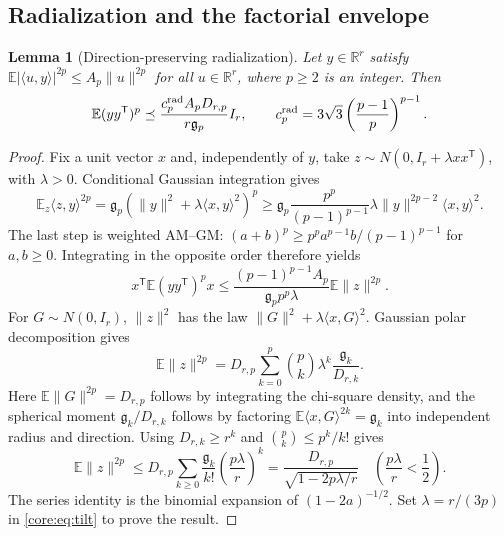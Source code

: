 \documentclass[11pt,a4paper]{article}
\newtheorem{lemma}[theorem]{Lemma}
\theoremstyle{definition}\newtheorem{definition}[theorem]{Definition}
\theoremstyle{remark}\newtheorem{remark}[theorem]{Remark}
\numberwithin{equation}{section}
\newcommand{\R}{\mathbb R}\newcommand{\E}{\mathbb E}\newcommand{\Pp}{\mathbb P}
\newcommand{\gmom}{\mathfrak g}
\newcommand{\norm}[1]{\lVert#1\rVert}\newcommand{\ip}[2]{\langle#1,#2\rangle}
\begin{document}
\subsection{Radialization and the factorial envelope}\label{appendix:factorial}
\begin{lemma}[Direction-preserving radialization]\label{core:lem:radial}
Let $y\in\R^r$ satisfy
$\E|\ip u y|^{2p}\le A_p\norm u^{2p}$ for all $u\in\R^r$, where
$p\ge2$ is an integer. Then
\begin{equation}\label{core:eq:radial}
 \E(yy^{\mathsf T})^p\preceq
 \frac{c_p^{\rm rad}A_pD_{r,p}}{r\gmom_p}I_r,\qquad
 c_p^{\rm rad}=3\sqrt3\left(\frac{p-1}{p}\right)^{p-1}.
\end{equation}
\end{lemma}
\begin{proof}
Fix a unit vector $x$ and, independently of $y$, take
$z\sim N(0,I_r+\lambda xx^{\mathsf T})$, with $\lambda>0$.
Conditional Gaussian integration gives
\[
 \E_z\ip z y^{2p}
 =\gmom_p(\norm y^2+\lambda\ip x y^2)^p
 \ge\gmom_p\frac{p^p}{(p-1)^{p-1}}\lambda
                  \norm y^{2p-2}\ip x y^2.
\]
The last step is weighted AM--GM:
$(a+b)^p\ge p^p a^{p-1}b/(p-1)^{p-1}$ for $a,b\ge0$.
Integrating in the opposite order therefore yields
\begin{equation}\label{core:eq:tilt}
 x^{\mathsf T}\E(yy^{\mathsf T})^px
 \le\frac{(p-1)^{p-1}A_p}{\gmom_pp^p\lambda}\E\norm z^{2p}.
\end{equation}
For $G\sim N(0,I_r)$, $\norm z^2$ has the law
$\norm G^2+\lambda\ip xG^2$. Gaussian polar decomposition gives
\[
 \E\norm z^{2p}
 =D_{r,p}\sum_{k=0}^p\binom pk\lambda^k
                  \frac{\gmom_k}{D_{r,k}}.
\]
Here $\E\norm G^{2p}=D_{r,p}$ follows by integrating the chi-square
density, and the spherical moment $\gmom_k/D_{r,k}$ follows by
factoring $\E\ip xG^{2k}=\gmom_k$ into independent radius and direction.
Using $D_{r,k}\ge r^k$ and $\binom pk\le p^k/k!$ gives
\[
 \E\norm z^{2p}\le
 D_{r,p}\sum_{k\ge0}\frac{\gmom_k}{k!}
                \left(\frac{p\lambda}{r}\right)^k
 =\frac{D_{r,p}}{\sqrt{1-2p\lambda/r}}
 \quad\left(\frac{p\lambda}{r}<\frac12\right).
\]
The series identity is the binomial expansion of $(1-2a)^{-1/2}$.
Set $\lambda=r/(3p)$ in \eqref{core:eq:tilt} to prove the result.
\end{proof}
\end{document}
